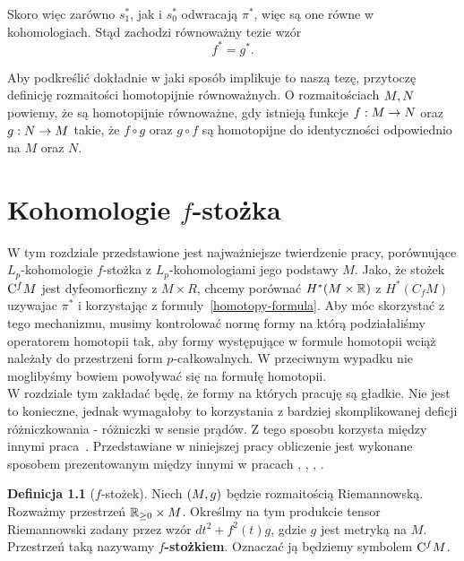 \documentclass[licencjacka]{pracamgr}
\theoremstyle{definition}
\newtheorem{definition}{Definicja}[section]
\theoremstyle{definition}
\theoremstyle{plain}
\theoremstyle{plain}
\theoremstyle{plain}
\theoremstyle{plain}
\def\cfm{\ensuremath\mathrm{C}^fM}
\def\M{\ensuremath M}
\def\N{\ensuremath N}
\def\R{\ensuremath\mathbb{R}}
\begin{document}
Skoro więc zarówno $s_1^\ast$, jak i $s_0^\ast$ odwracają $\pi^\ast$, więc
są one równe w kohomologiach. Stąd zachodzi równoważny tezie wzór
\[
f^\ast = g^\ast.
\] 

Aby podkreślić dokładnie w jaki sposób implikuje to naszą tezę, przytoczę
definicję rozmaitości homotopijnie równoważnych. O rozmaitościach $\M, \N$
powiemy, że są homotopijnie równoważne, gdy istnieją funkcje
$f: \M \rightarrow \N$ oraz $g: \N \rightarrow \M$ takie, że
$f \circ g$ oraz $g \circ f$ są homotopijne do identyczności odpowiednio
na $M$ oraz $N$. \\


\chapter{Kohomologie $f$-stożka}
W tym rozdziale przedstawione jest najważniejsze twierdzenie pracy, porównujące
$L_p$-kohomologie $f$-stożka z $L_p$-kohomologiami jego podstawy $M$.  Jako, że
stożek $\cfm$ jest dyfeomorficzny z $ M\times R$, chcemy porównać $H^*(M\times
\R)$ z $H^*(C_fM)$ uzywajac $\pi^*$ i korzystając z
formuly~\ref{homotopy-formula}.  Aby móc skorzystać z tego mechanizmu, musimy
kontrolować normę formy na którą podziałaliśmy operatorem homotopii tak, aby
formy występujące w formule homotopii wciąż należały do przestrzeni form
$p$-całkowalnych. W przeciwnym wypadku nie moglibyśmy bowiem powoływać się
na formułę homotopii. \\

W rozdziale tym zakładać będę, że formy na których pracuję są gładkie. Nie jest
to konieczne, jednak wymagałoby to korzystania z bardziej skomplikowanej
deficji różniczkowania - różniczki w sensie prądów. Z tego sposobu korzysta
między innymi praca~\cite{weber}.  Przedstawiane w niniejszej pracy obliczenie
jest wykonane sposobem prezentowanym między innymi w pracach \cite{cheeger},
\cite{youssin}, \cite{kirwan}, \cite{weber}. \\


\begin{definition}[$f$-stożek]
    Niech $(\M, g)$ będzie rozmaitością Riemannowską. Rozważmy przestrzeń
    $\mathbb{R}_{\geq 0} \times \M$. Określmy na tym produkcie tensor
    Riemannowski zadany przez wzór $dt^2 + f^{2}(t)g $, gdzie $g$ jest
    metryką na $M$.  Przestrzeń taką nazywamy \textbf{$f$-stożkiem}.
    Oznaczać ją będziemy symbolem $\cfm$.
\end{definition}
\end{document}
